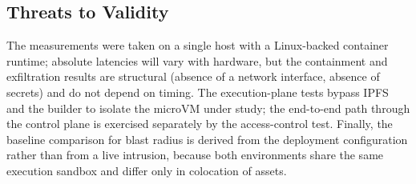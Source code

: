 \subsection{Threats to Validity}

The measurements were taken on a single host with a Linux-backed container
runtime; absolute latencies will vary with hardware, but the containment and
exfiltration results are structural (absence of a network interface, absence of
secrets) and do not depend on timing. The execution-plane tests bypass IPFS and
the builder to isolate the microVM under study; the end-to-end path through the
control plane is exercised separately by the access-control test. Finally, the
baseline comparison for blast radius is derived from the deployment configuration
rather than from a live intrusion, because both environments share the same
execution sandbox and differ only in colocation of assets.
